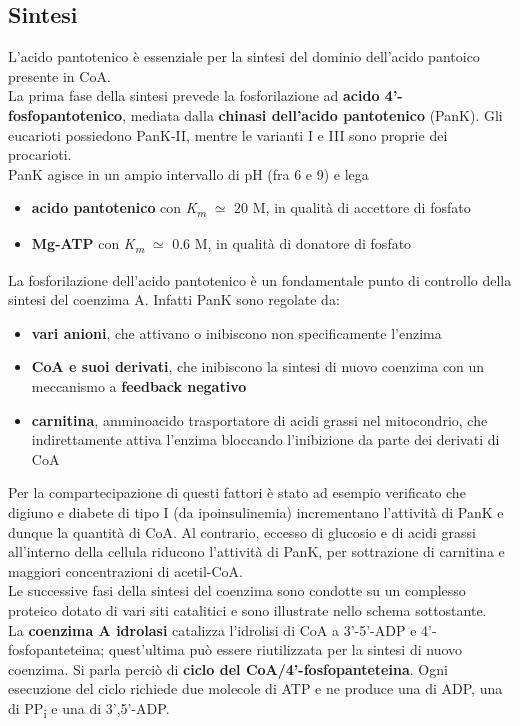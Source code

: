 \documentclass[a4paper, 12pt]{article}
\begin{document}
\subsection{Sintesi}
L'acido pantotenico è essenziale per la sintesi del dominio dell'acido pantoico presente in CoA.\\
La prima fase della sintesi prevede la fosforilazione ad \textbf{acido 4'-fosfopantotenico}, mediata dalla \textbf{chinasi dell'acido pantotenico} (PanK). Gli eucarioti possiedono PanK-II, mentre le varianti I e III sono proprie dei procarioti.\\
PanK agisce in un ampio intervallo di pH (fra 6 e 9) e lega \begin{itemize}
\item \textbf{acido pantotenico} con \textit{K\textsubscript{m}} $\simeq$ 20 {\textmu}M, in qualità di accettore di fosfato
\item  \textbf{Mg-ATP} con \textit{K\textsubscript{m}} $\simeq$ 0.6 {\textmu}M, in qualità di donatore di fosfato
\end{itemize}
La fosforilazione dell'acido pantotenico è un fondamentale punto di controllo della sintesi del coenzima A. Infatti PanK sono regolate da:
\begin{itemize}
\item \textbf{vari anioni}, che attivano o inibiscono non specificamente l'enzima
\item \textbf{CoA e suoi derivati}, che inibiscono la sintesi di nuovo coenzima con un meccanismo a \textbf{feedback negativo}
\item \textbf{carnitina}, amminoacido trasportatore di acidi grassi nel mitocondrio, che indirettamente attiva l'enzima bloccando l'inibizione da parte dei derivati di CoA
\end{itemize}
Per la compartecipazione di questi fattori è stato ad esempio verificato che digiuno e diabete di tipo I (da ipoinsulinemia) incrementano l'attività di PanK e dunque la quantità di CoA. Al contrario, eccesso di glucosio e di acidi grassi all'interno della cellula riducono l'attività di PanK, per sottrazione di carnitina e maggiori concentrazioni di acetil-CoA.\\
Le successive fasi della sintesi del coenzima sono condotte su un complesso proteico dotato di vari siti catalitici e sono illustrate nello schema sottostante.\\
La \textbf{coenzima A idrolasi} catalizza l'idrolisi di CoA a 3'-5'-ADP e 4'-fosfopanteteina; quest'ultima può essere riutilizzata per la sintesi di nuovo coenzima. Si parla perciò di \textbf{ciclo del CoA/4'-fosfopanteteina}. Ogni esecuzione del ciclo richiede due molecole di ATP e ne produce una di ADP, una di PP\textsubscript{i} e una di 3',5'-ADP.
\end{document}
